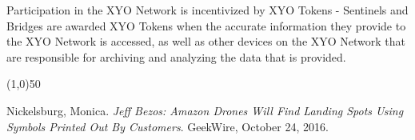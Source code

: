 \documentclass{article}
\begin{document}
Participation in the XYO Network is incentivized by XYO Tokens - Sentinels and Bridges are awarded XYO Tokens when the accurate information they provide to the XYO Network is accessed, as well as other devices on the XYO Network that are responsible for archiving and analyzing the data that is provided.  


\begin{center}
\line(1,0){50}
\end{center}


\clearpage
 
 \begin{thebibliography}{9}

Nickelsburg, Monica.
\textit{Jeff Bezos: Amazon Drones Will Find Landing Spots Using Symbols Printed Out By Customers}.
GeekWire, October 24, 2016.

\end{thebibliography}

\printglossaries
\end{document}
